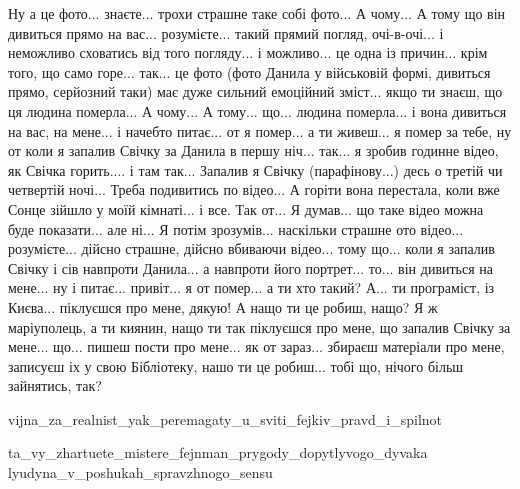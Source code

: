 Ну а це фото... знаєте... трохи страшне таке собі фото... А чому... А
тому що він дивиться прямо на вас... розумієте... такий прямий погляд,
очі-в-очі... і неможливо сховатись від того погляду... і можливо... це одна із
причин... крім того, що само горе... так... це фото (фото Данила у військовій
формі, дивиться прямо, серйозний таки) має дуже сильний емоційний зміст... якщо
ти знаєш, що ця людина померла... А чому... А тому... що... людина померла... і
вона дивиться на вас, на мене... і начебто питає... от я помер... а ти живеш...
я помер за тебе, ну от коли я запалив Свічку за Данила в першу ніч... так... я
зробив годинне відео, як Свічка горить.... і там так... Запалив я Свічку
(парафінову...) десь о третій чи четвертій ночі... Треба подивитись по відео...
А горіти вона перестала, коли вже Сонце зійшло у моїй кімнаті... і все. Так
от... Я думав... що таке відео можна буде показати... але ні... Я потім
зрозумів... наскільки страшне ото відео... розумієте... дійсно страшне, дійсно
вбиваючи відео... тому що...  коли я запалив Свічку і сів навпроти Данила... а
навпроти його портрет... то... він дивиться на мене... ну і питає... привіт...
я от помер... а ти хто такий? А... ти програміст, із Києва... піклуєшся про
мене, дякую! А нащо ти це робиш, нащо? Я ж маріуполець, а ти киянин, нащо ти
так піклуєшся про мене, що запалив Свічку за мене... що... пишеш пости про
мене... як от зараз... збираєш матеріали про мене, записуєш іх у свою
Бібліотеку, нашо ти це робиш... тобі що, нічого більш зайнятись, так?

vijna_za_realnist_yak_peremagaty_u_sviti_fejkiv_pravd_i_spilnot

ta_vy_zhartuete_mistere_fejnman_prygody_dopytlyvogo_dyvaka
lyudyna_v_poshukah_spravzhnogo_sensu

